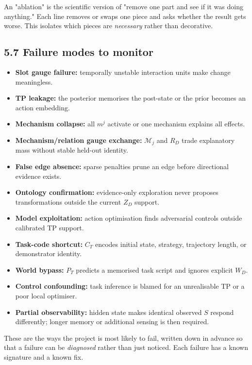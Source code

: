 \documentclass[11pt]{article}
\newenvironment{plainword}{%
  \par\medskip\noindent\begin{minipage}{\textwidth}%
  \color{gray!75!black}\small\itshape
}{%
  \end{minipage}\par\medskip}
\begin{document}
\begin{plainword}
An "ablation" is the scientific version of "remove one part and see if it was doing anything." Each line removes or swaps one piece
and asks whether the result gets worse. This isolates which pieces are \emph{necessary} rather than decorative.
\end{plainword}

\subsection*{5.7 Failure modes to monitor}

\begin{itemize}
\item \textbf{Slot gauge failure:} temporally unstable interaction units make change meaningless.
\item \textbf{TP leakage:} the posterior memorises the post-state or the prior becomes an action embedding.
\item \textbf{Mechanism collapse:} all $m^j$ activate or one mechanism explains all effects.
\item \textbf{Mechanism/relation gauge exchange:} $\mathcal M_j$ and $R_D$ trade explanatory mass without stable held-out identity.
\item \textbf{False edge absence:} sparse penalties prune an edge before directional evidence exists.
\item \textbf{Ontology confirmation:} evidence-only exploration never proposes transformations outside the current $Z_D$ support.
\item \textbf{Model exploitation:} action optimisation finds adversarial controls outside calibrated TP support.
\item \textbf{Task-code shortcut:} $C_T$ encodes initial state, strategy, trajectory length, or demonstrator identity.
\item \textbf{World bypass:} $P_T$ predicts a memorised task script and ignores explicit $W_D$.
\item \textbf{Control confounding:} task inference is blamed for an unrealisable TP or a poor local optimiser.
\item \textbf{Partial observability:} hidden state makes identical observed $S$ respond differently; longer memory or additional
sensing is then required.
\end{itemize}

\begin{plainword}
These are the ways the project is most likely to fail, written down in advance so that a failure can be \emph{diagnosed} rather than
just noticed. Each failure has a known signature and a known fix.
\end{plainword}
\end{document}
